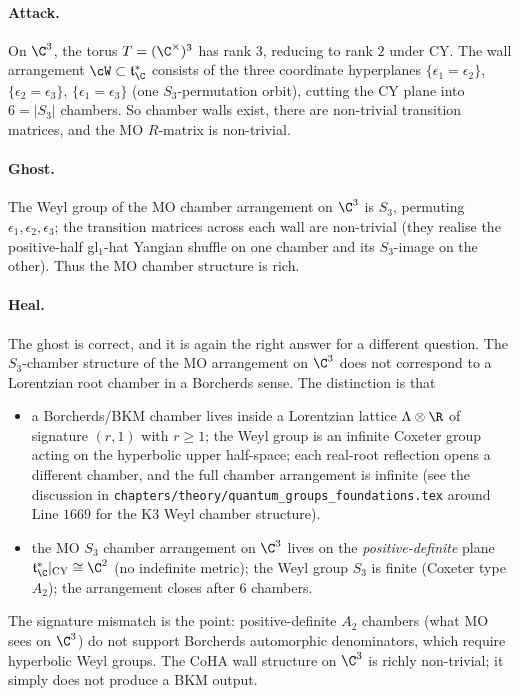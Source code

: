 \paragraph{Attack.} On $\C^3$, the torus $T = (\C^\times)^3$ has
rank $3$, reducing to rank $2$ under CY. The wall arrangement
$\cW \subset \mathfrak t^*_\C$ consists of the three coordinate
hyperplanes $\{\epsilon_1 = \epsilon_2\}$, $\{\epsilon_2 =
\epsilon_3\}$, $\{\epsilon_1 = \epsilon_3\}$ (one $S_3$-permutation
orbit), cutting the CY plane into $6 = |S_3|$ chambers. So chamber
walls exist, there are non-trivial transition matrices, and the
MO $R$-matrix is non-trivial.

\paragraph{Ghost.} The Weyl group of the MO chamber arrangement on
$\C^3$ is $S_3$, permuting $\epsilon_1, \epsilon_2, \epsilon_3$; the
transition matrices across each wall are non-trivial (they realise
the positive-half gl$_1$-hat Yangian shuffle on one chamber and its
$S_3$-image on the other). Thus the MO chamber structure is rich.

\paragraph{Heal.} The ghost is correct, and it is again the right
answer for a different question. The $S_3$-chamber structure of the
MO arrangement on $\C^3$ does not correspond to a Lorentzian root
chamber in a Borcherds sense. The distinction is that
\begin{itemize}
 \item a Borcherds/BKM chamber lives inside a Lorentzian lattice
 $\Lambda \otimes \R$ of signature $(r, 1)$ with $r \geq 1$; the
 Weyl group is an infinite Coxeter group acting on the hyperbolic
 upper half-space; each real-root reflection opens a different
 chamber, and the full chamber arrangement is infinite (see the
 discussion in \texttt{chapters/theory/quantum\_groups\_foundations.tex}
 around Line $1669$ for the K3 Weyl chamber structure).
 \item the MO $S_3$ chamber arrangement on $\C^3$ lives on the
 \emph{positive-definite} plane $\mathfrak t^*_\C|_{\mathrm{CY}}
 \cong \C^2$ (no indefinite metric); the Weyl group $S_3$ is finite
 (Coxeter type $A_2$); the arrangement closes after $6$ chambers.
\end{itemize}
The signature mismatch is the point: positive-definite $A_2$
chambers (what MO sees on $\C^3$) do not support Borcherds automorphic
denominators, which require hyperbolic Weyl groups. The CoHA wall
structure on $\C^3$ is richly non-trivial; it simply does not
produce a BKM output.

